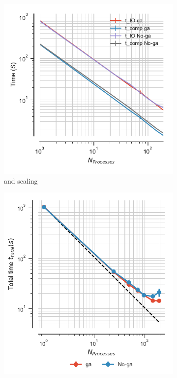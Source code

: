  \begin{figure}[ht!]
\centering
\begin{subfigure}{.3\textwidth}
  \includegraphics[width=\linewidth]{figures/Comparison_IO_compute_scaling_traj_splitting-chain-reader.pdf}
  \caption{\tcomp and \tIO scaling}
  \label{fig:MPIscaling-chain-reader}
\end{subfigure}
\hfill
\begin{subfigure}{.3\textwidth}
  \includegraphics[width=\linewidth]{figures/Comparison_tot_time_traj_splitting-chain-reader.pdf}

\end{subfigure}
\end{figure}
